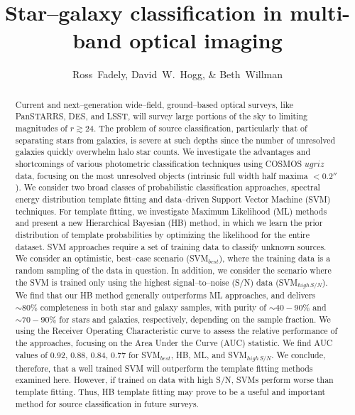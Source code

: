 \documentclass[12pt,preprint]{aastex}
\begin{document}
\title{Star--galaxy classification in multi-band optical imaging}
\author{Ross~Fadely,
        David~W.~Hogg,
        \& Beth~Willman}



%
%
\begin{abstract}

Current and next--generation wide--field, ground--based optical surveys, like PanSTARRS, DES, and LSST, will survey large 
portions of the sky to limiting magnitudes of $r \gtrsim 24$.  The problem of source classification, particularly that of separating 
stars from galaxies, is severe at such depths since the number of unresolved galaxies quickly overwhelm halo star counts.  
We investigate the advantages and shortcomings of various photometric classification techniques using COSMOS 
$ugriz$ data, focusing on the most unresolved objects (intrinsic full width half maxima $<0.2''$).  We consider two broad classes of 
probabilistic classification approaches, spectral energy distribution template fitting and data--driven Support Vector Machine 
 (SVM) techniques.  For template fitting, we investigate Maximum Likelihood (ML) methods and present a new Hierarchical Bayesian 
(HB) method, in which we learn the prior distribution of template probabilities by optimizing the likelihood for the entire dataset.  
SVM approaches require a set of training data to classify unknown sources.  We consider an optimistic, best--case scenario 
(SVM$_{best}$), where the training data is a random sampling of the data in question.  In addition, we consider the scenario 
where the SVM is trained only using the highest signal--to--noise (S/N) data (SVM$_{high\,S/N}$).  We find that our HB method 
generally outperforms ML approaches, and delivers $\sim80\%$ completeness in both star and galaxy samples, with purity 
of $\sim40-90\%$ and $\sim70-90\%$ for stars and galaxies, respectively, depending on the sample fraction.  We using the 
Receiver Operating Characteristic curve to assess the relative performance of the approaches, focusing on the Area Under 
the Curve (AUC) statistic.  We find AUC values of 0.92, 0.88, 0.84, 0.77 for SVM$_{best}$, HB, ML, and SVM$_{high\,S/N}$.  
We conclude, therefore, that a well trained SVM will outperform the template fitting methods examined here.  However, if 
trained on data with high S/N, SVMs perform worse than template fitting.  Thus, HB template fitting may prove to be a useful and 
important method for source classification in future surveys.

\end{abstract}
\end{document}
